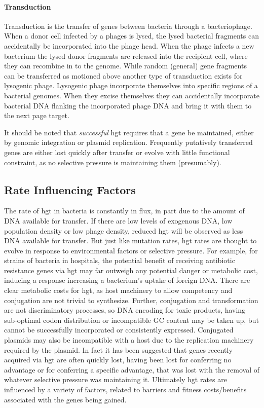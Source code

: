 \documentclass[12pt,letter]{article}
\begin{document}
\paragraph{Transduction}
Transduction is the transfer of genes between bacteria through a bacteriophage\citep{transd}.
When a donor cell infected by a phages is lysed, the lysed bacterial fragments can accidentally be incorporated into the phage head\citep{transd}.
When the phage infects a new bacterium the lysed donor fragments are released into the recipient cell, where they can recombine in to the genome\citep{transd}.
While random (general) gene fragments can be transferred as motioned above another type of transduction exists for lysogenic phage\citep{transd}.
Lysogenic phage incorporate themselves into specific regions of a bacterial genomes\citep{transd}.
When they excise themselves they can accidentally incorporate bacterial DNA flanking the incorporated phage DNA and bring it with them to the next page target\citep{transd}.\par
It should be noted that \textit{successful} \ac{hgt} requires that a gene be maintained, either by genomic integration or plasmid replication.
Frequently putatively transferred genes are either lost quickly after transfer or evolve with little functional constraint, as no selective pressure is maintaining them (presumably)\citep{fastlane}.
\subsection{Rate Influencing Factors}
The rate of \ac{hgt} in bacteria is constantly in flux, in part due to the amount of DNA available for transfer\citep{trendbs}.
If there are low levels of exogenous DNA, low population density or low phage density, reduced \ac{hgt} will be observed as less DNA available for transfer\citep{lgt}.
But just like mutation rates, \ac{hgt} rates are thought to evolve in response to environmental factors or selective pressure\citep{mtrate,hgtrate}.
For example, for strains of bacteria in hospitals, the potential benefit of receiving antibiotic resistance genes via \ac{hgt} may far outweigh any potential danger or metabolic cost, inducing a response increasing a bacterium's uptake of foreign DNA.\citep{hospital}
There are clear metabolic costs for \ac{hgt}, as host machinery to allow competency and conjugation are not trivial to synthesize\citep{hgtcost}.
Further, conjugation and transformation are not discriminatory processes, so DNA encoding for toxic products, having sub-optimal codon distribution or incompatible GC content may be taken up, but cannot be successfully incorporated or consistently expressed\citep{hgtcost}.
Conjugated plasmids may also be incompatible with a host due to the replication machinery required by the plasmid\citep{plasincom}.
In fact it has been suggested that genes recently acquired via \ac{hgt} are often quickly lost, having been lost for conferring no advantage or for conferring a specific advantage, that was lost with the removal of whatever selective pressure was maintaining it\citep{fastlane}.
Ultimately \ac{hgt} rates are influenced by a variety of factors, related to barriers and fitness costs/benefits associated with the genes being gained.
\end{document}
